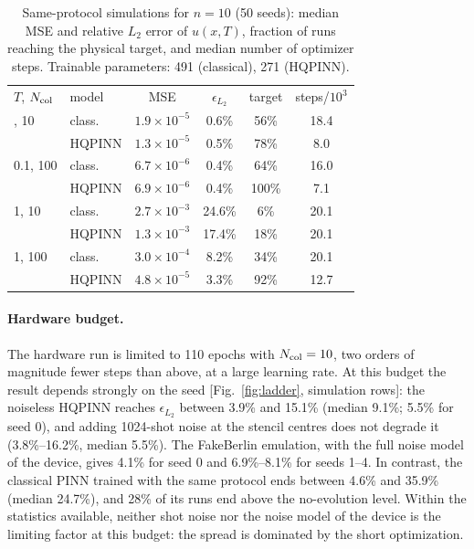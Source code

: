 \documentclass[floatfix,aps,pra,twocolumn,superscriptaddress,10pt,nofootinbib]{revtex4-2}
\newcommand{\Ncol}{N_{\rm col}}
\begin{document}
\begin{table}[b]
\caption{\justifying Same-protocol simulations for $n=10$ (50 seeds): median MSE and relative $L_2$ error of $u(x,T)$, fraction of runs reaching the physical target, and median number of optimizer steps. Trainable parameters: 491 (classical), 271 (HQPINN).}
\label{tab:sim}
\setlength{\tabcolsep}{1.5pt}
\footnotesize
\begin{ruledtabular}
\begin{tabular}{llcccc}
$T$, $\Ncol$ & model & MSE & $\epsilon_{L_2}$ & target & steps/$10^3$\\
\colrule
0.1, 10  & class. & $1.9{\times}10^{-5}$ & 0.6\% & 56\% & 18.4\\
         & HQPINN & $1.3{\times}10^{-5}$ & 0.5\% & 78\% & 8.0\\
0.1, 100 & class. & $6.7{\times}10^{-6}$ & 0.4\% & 64\% & 16.0\\
         & HQPINN & $6.9{\times}10^{-6}$ & 0.4\% & 100\% & 7.1\\
1, 10    & class. & $2.7{\times}10^{-3}$ & 24.6\% & 6\% & 20.1\\
         & HQPINN & $1.3{\times}10^{-3}$ & 17.4\% & 18\% & 20.1\\
1, 100   & class. & $3.0{\times}10^{-4}$ & 8.2\% & 34\% & 20.1\\
         & HQPINN & $4.8{\times}10^{-5}$ & 3.3\% & 92\% & 12.7\\
\end{tabular}
\end{ruledtabular}
\end{table}

\paragraph{Hardware budget.} The hardware run is limited to 110 epochs with $\Ncol=10$, two orders of magnitude fewer steps than above, at a large learning rate. At this budget the result depends strongly on the seed [Fig.~\ref{fig:ladder}, simulation rows]: the noiseless HQPINN reaches $\epsilon_{L_2}$ between 3.9\% and 15.1\% (median 9.1\%; 5.5\% for seed 0), and adding 1024-shot noise at the stencil centres does not degrade it (3.8\%--16.2\%, median 5.5\%). The FakeBerlin emulation, with the full noise model of the device, gives 4.1\% for seed 0 and 6.9\%--8.1\% for seeds 1--4. In contrast, the classical PINN trained with the same protocol ends between 4.6\% and 35.9\% (median 24.7\%), and 28\% of its runs end above the no-evolution level. Within the statistics available, neither shot noise nor the noise model of the device is the limiting factor at this budget: the spread is dominated by the short optimization.
\end{document}
